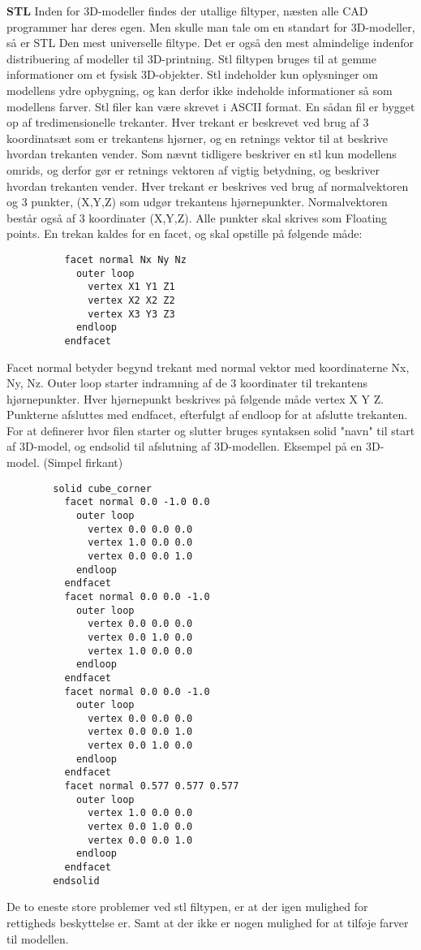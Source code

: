 \textbf{STL}
Inden for 3D-modeller findes der utallige filtyper, næsten alle CAD programmer har deres egen. Men skulle man tale om en standart for 3D-modeller, så er STL Den mest universelle filtype. Det er også den mest almindelige indenfor distribuering af modeller til 3D-printning. \cite{makerbot}
Stl filtypen bruges til at gemme informationer om et fysisk 3D-objekter. Stl indeholder kun oplysninger om modellens ydre opbygning, og kan derfor ikke indeholde informationer så som modellens farver. 
Stl filer kan være skrevet i ASCII format. 
En sådan fil er bygget op af tredimensionelle trekanter. 
Hver trekant er beskrevet ved brug af 3 koordinatsæt som er trekantens hjørner, og en retnings vektor til at beskrive hvordan trekanten vender. 
Som nævnt tidligere beskriver en stl kun modellens omrids, og derfor gør er retnings vektoren af vigtig betydning, og beskriver hvordan trekanten vender. \cite{stl}
Hver trekant er beskrives ved brug af normalvektoren og 3 punkter, (X,Y,Z) som udgør trekantens hjørnepunkter. Normalvektoren består også af 3 koordinater (X,Y,Z). Alle punkter skal skrives som Floating points\cite{stl}.
En trekan kaldes for en facet, og skal opstille på følgende måde:
\begin{lstlisting}
          facet normal Nx Ny Nz
            outer loop
              vertex X1 Y1 Z1
              vertex X2 X2 Z2
              vertex X3 Y3 Z3
            endloop
          endfacet
\end{lstlisting}
Facet normal betyder begynd trekant med normal vektor med koordinaterne Nx, Ny, Nz. Outer loop starter indramning af de 3 koordinater til trekantens hjørnepunkter. Hver hjørnepunkt beskrives på følgende måde vertex X Y Z. Punkterne afsluttes med endfacet, efterfulgt af endloop for at afslutte trekanten. 
For at definerer hvor filen starter og slutter bruges syntaksen solid "navn" til start af 3D-model, og endsolid til afslutning af 3D-modellen.
\newpage
Eksempel på en 3D-model. (Simpel firkant) \cite{Stl_Eksempel}
\begin{lstlisting}
        solid cube_corner
          facet normal 0.0 -1.0 0.0
            outer loop
              vertex 0.0 0.0 0.0
              vertex 1.0 0.0 0.0
              vertex 0.0 0.0 1.0
            endloop
          endfacet
          facet normal 0.0 0.0 -1.0
            outer loop
              vertex 0.0 0.0 0.0
              vertex 0.0 1.0 0.0
              vertex 1.0 0.0 0.0
            endloop
          endfacet
          facet normal 0.0 0.0 -1.0
            outer loop
              vertex 0.0 0.0 0.0
              vertex 0.0 0.0 1.0
              vertex 0.0 1.0 0.0
            endloop
          endfacet
          facet normal 0.577 0.577 0.577
            outer loop
              vertex 1.0 0.0 0.0
              vertex 0.0 1.0 0.0
              vertex 0.0 0.0 1.0
            endloop
          endfacet
        endsolid
\end{lstlisting}
De to eneste store problemer ved stl filtypen, er at der igen mulighed for rettigheds beskyttelse er. Samt at der ikke er nogen mulighed for at tilføje farver til modellen.



%    
%    
